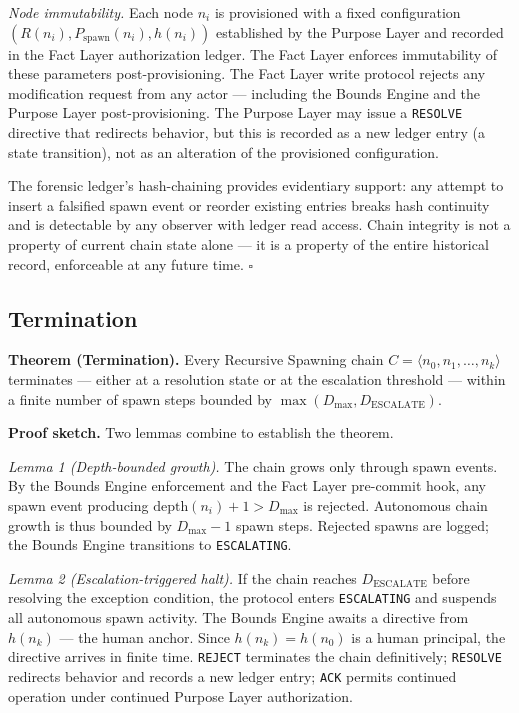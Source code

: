 \medskip
\textit{Node immutability.} Each node $n_i$ is provisioned with a fixed configuration $(R(n_i), P_{\mathrm{spawn}}(n_i), h(n_i))$ established by the Purpose Layer and recorded in the Fact Layer authorization ledger. The Fact Layer enforces immutability of these parameters post-provisioning. The Fact Layer write protocol rejects any modification request from any actor — including the Bounds Engine and the Purpose Layer post-provisioning. The Purpose Layer may issue a \texttt{RESOLVE} directive that redirects behavior, but this is recorded as a new ledger entry (a state transition), not as an alteration of the provisioned configuration.

The forensic ledger's hash-chaining provides evidentiary support: any attempt to insert a falsified spawn event or reorder existing entries breaks hash continuity and is detectable by any observer with ledger read access. Chain integrity is not a property of current chain state alone — it is a property of the entire historical record, enforceable at any future time. $\square$

\subsection{Termination}
\label{sec:rs-termination}

\medskip
\noindent\textbf{Theorem (Termination).} Every Recursive Spawning chain $C = \langle n_0, n_1, \ldots, n_k \rangle$ terminates — either at a resolution state or at the escalation threshold — within a finite number of spawn steps bounded by $\max(D_{\max}, D_{\mathrm{ESCALATE}})$.

\medskip
\noindent\textbf{Proof sketch.} Two lemmas combine to establish the theorem.

\medskip
\textit{Lemma 1 (Depth-bounded growth).} The chain grows only through spawn events. By the Bounds Engine enforcement and the Fact Layer pre-commit hook, any spawn event producing $\text{depth}(n_i) + 1 > D_{\max}$ is rejected. Autonomous chain growth is thus bounded by $D_{\max} - 1$ spawn steps. Rejected spawns are logged; the Bounds Engine transitions to \texttt{ESCALATING}.

\medskip
\textit{Lemma 2 (Escalation-triggered halt).} If the chain reaches $D_{\mathrm{ESCALATE}}$ before resolving the exception condition, the protocol enters \texttt{ESCALATING} and suspends all autonomous spawn activity. The Bounds Engine awaits a directive from $h(n_k)$ — the human anchor. Since $h(n_k) = h(n_0)$ is a human principal, the directive arrives in finite time. \texttt{REJECT} terminates the chain definitively; \texttt{RESOLVE} redirects behavior and records a new ledger entry; \texttt{ACK} permits continued operation under continued Purpose Layer authorization.

